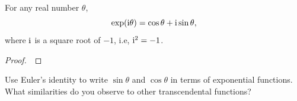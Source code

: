 \begin{theorem}
For any real number $\theta$,
\begin{equation*}
\exp(\mathrm{i}\theta) = \cos\theta + \mathrm{i}\sin\theta,
\end{equation*}
where $\mathrm{i}$ is a square root of $-1$, i.e, $\mathrm{i}^2=-1$.
\end{theorem}
\ifdefined\SOLUTION
{}
\else
\begin{proof}
\,
\vspace{4.5in}

\end{proof}
\fi

\newpage

\begin{example}
Use Euler's identity to write $\sin\theta$ and $\cos\theta$ in terms of exponential functions.
What similarities do you observe to other transcendental functions?
\end{example}

\newpage


